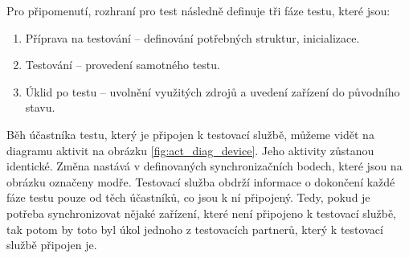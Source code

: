 Pro připomenutí, rozhraní pro test následně definuje tři fáze testu, které jsou:

\begin{enumerate}
    \item Příprava na testování -- definování potřebných struktur, inicializace.
    \item Testování -- provedení samotného testu.
    \item Úklid po testu -- uvolnění využitých zdrojů a uvedení zařízení do původního stavu.
\end{enumerate}

Běh účastníka testu, který je připojen k testovací službě, můžeme vidět na diagramu aktivit na obrázku \ref{fig:act_diag_device}. Jeho aktivity zůstanou identické. Změna nastává v definovaných synchronizačních bodech, které jsou na obrázku označeny modře. Testovací služba obdrží informace o dokončení každé fáze testu pouze od těch účastníků, co jsou k ní připojený. Tedy, pokud je potřeba synchronizovat nějaké zařízení, které není připojeno k testovací službě, tak potom by toto byl úkol jednoho z testovacích partnerů, který k testovací službě připojen je. 

